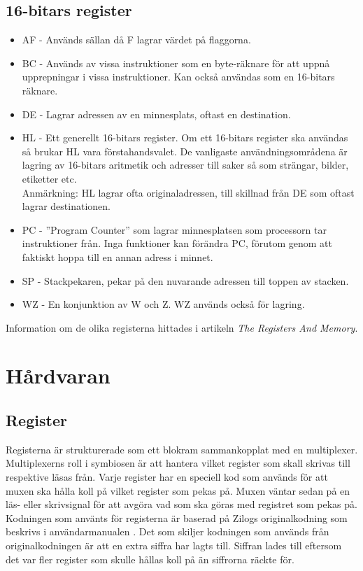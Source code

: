 \documentclass{article}
\begin{document}
\subsection{16-bitars register}
\begin{itemize}
    \item AF - Används sällan då F lagrar värdet på flaggorna.
    \item BC - Används av vissa instruktioner som en byte-räknare för att uppnå
    upprepningar i vissa instruktioner. Kan också användas som en 16-bitars
    räknare.
    \item DE - Lagrar adressen av en minnesplats, oftast en destination.
    \item HL - Ett generellt 16-bitars register. Om ett 16-bitars register ska
    användas så brukar HL vara förstahandsvalet. De vanligaste
    användningsområdena är lagring av 16-bitars aritmetik och adresser till
    saker så som strängar, bilder, etiketter etc.\\
    Anmärkning: HL lagrar ofta originaladressen, till skillnad från DE som
    oftast lagrar destinationen.
    \item PC - ''Program Counter'' som lagrar minnesplatsen som processorn tar
    instruktioner från. Inga funktioner kan förändra PC, förutom genom att
    faktiskt hoppa till en annan adress i minnet.
    \item SP - Stackpekaren, pekar på den nuvarande adressen till toppen av stacken.
    \item WZ - En konjunktion av W och Z. WZ används också för lagring.
\end{itemize}

Information om de olika registerna hittades i artikeln  \emph{The Registers And Memory}. \cite{regsandmem}

\clearpage
\section{Hårdvaran}
\subsection{Register}
Registerna är strukturerade som ett blokram sammankopplat med en multiplexer.
Multiplexerns roll i symbiosen är att hantera vilket register som skall skrivas
till respektive läsas från. Varje register har en speciell kod som används för
att muxen ska hålla koll på vilket register som pekas på. Muxen väntar sedan på
en läs- eller skrivsignal för att avgöra vad som ska göras med registret som
pekas på. Kodningen som använts för registerna är baserad på Zilogs
originalkodning som beskrivs i användarmanualen \cite{userman}. Det som skiljer
kodningen som används från originalkodningen är att en extra siffra har lagts
till. Siffran lades till eftersom det var fler register som skulle hållas koll
på än siffrorna räckte för.
\end{document}
